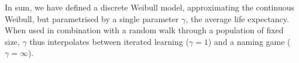 \documentclass{../src/bcthesispart}
\begin{document}
In sum, we have defined a discrete Weibull model, approximating the continuous Weibull, but parametrised by a single parameter $\gamma$, the average life expectancy. 
When used in combination with a random walk through a population of fixed size, $\gamma$ thus interpolates between iterated learning ($\gamma=1$) and a naming game ($\gamma=\infty$).




\showbibliography
\end{document}

